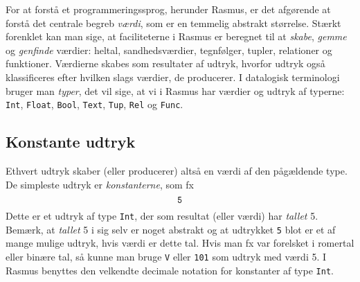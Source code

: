 \documentclass{article}
\begin{document}
For at forst\aa{} et 
programmeringssprog, herunder {\sc Rasmus}, er det 
afg\o{}rende at forst\aa{}
det centrale begreb {\em v\ae{}rdi}, som er en temmelig abstrakt
st\o{}rrelse. St\ae{}rkt forenklet kan man sige, at faciliteterne i
{\sc Rasmus} er beregnet til at {\em skabe}, {\em gemme\/}
og {\em genfinde\/} v\ae{}rdier: heltal, sandhedsv\ae{}rdier,
tegnf\o{}lger, tupler, relationer og funktioner.
V\ae{}rdierne skabes som resultater af udtryk, hvorfor udtryk ogs\aa{}
klassificeres efter hvilken slags v\ae{}rdier, de producerer.
I datalogisk terminologi bruger man {\em typer}, det vil sige,
at vi i {\sc Rasmus} har v\ae{}rdier og udtryk af typerne:
\verb"Int", \verb"Float", \verb"Bool", \verb"Text", \verb"Tup", \verb"Rel" og \verb"Func".

\subsection{Konstante udtryk}
Ethvert udtryk skaber (eller producerer) alts\aa{} en v\ae{}rdi af den
p\aa{}g\ae{}ldende type. De simpleste udtryk er {\em konstanterne},
som fx
$$\mbox{\tt 5}$$
Dette er et udtryk af type \verb"Int", der som resultat (eller v\ae{}rdi)
har {\em tallet\/} 5. Bem\ae{}rk, at {\em tallet\/} 5 i sig selv er noget
abstrakt og at udtrykket {\tt 5} blot er et af mange mulige udtryk, hvis
v\ae{}rdi er dette tal. Hvis man fx var forelsket i romertal eller
bin\ae{}re tal, s\aa{} kunne man bruge \verb"V" eller \verb"101" som
udtryk med v\ae{}rdi 5. I {\sc Rasmus} benyttes den velkendte decimale
notation for konstanter af type \verb"Int".
\end{document}
